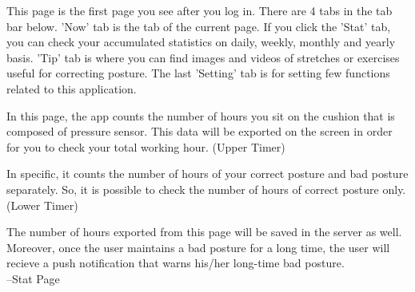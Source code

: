 \documentclass[conference]{IEEEtran}
\begin{document}
 This page is the first page you see after you log in. There are 4 tabs in the tab bar below. 'Now' tab is the tab of the current page. If you click the 'Stat' tab, you can check your accumulated statistics on daily, weekly, monthly  and yearly basis. 'Tip' tab is where you can find images and videos of stretches or exercises useful for correcting posture. The last 'Setting' tab is for setting few functions related to this application.

 In this page, the app counts the number of hours you sit on the cushion that is composed of pressure sensor. This data will be exported on the screen in order for you to check your total working hour. (Upper Timer)
 
In specific, it counts the number of hours of your correct posture and bad posture separately. So, it is possible to check the number of hours of correct posture only. (Lower Timer)

 The number of hours exported from this page will be saved in the server as well. Moreover, once the user maintains a bad posture for a long time, the user will recieve a push notification that warns his/her long-time bad  posture.\\

 --Stat Page
\end{document}
